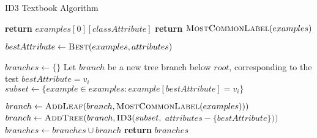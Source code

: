 \begin{algorithm}[H]
\caption{ID3 Textbook Algorithm}\label{a:id3-simple}
\begin{algorithmic}[1]
        \State \textbf{return} $examples[0][classAttribute]$
        \State \textbf{return} $\textsc{MostCommonLabel}(examples)$
    \EndIf

    \State $bestAttribute \gets \textsc{Best}(examples, attributes)$

    \State $branches \gets \{\}$
        \State Let $branch$ be a new tree branch below $root$, corresponding to the test $bestAttribute = v_i$
        \State $subset \gets \{example \in examples : example[bestAttribute] = v_i\}$

            \State $branch \gets \textsc{AddLeaf}(branch, \textsc{MostCommonLabel}(examples)))$
        \Else
            \State $branch \gets \textsc{AddTree}(branch, \textsc{ID3}(subset,$ $attributes - \{bestAttribute\}))$
        \EndIf
        \State $branches \gets branches \cup branch$
    \EndFor
    \State \textbf{return} $branches$
\EndProcedure
\end{algorithmic}
\end{algorithm}

